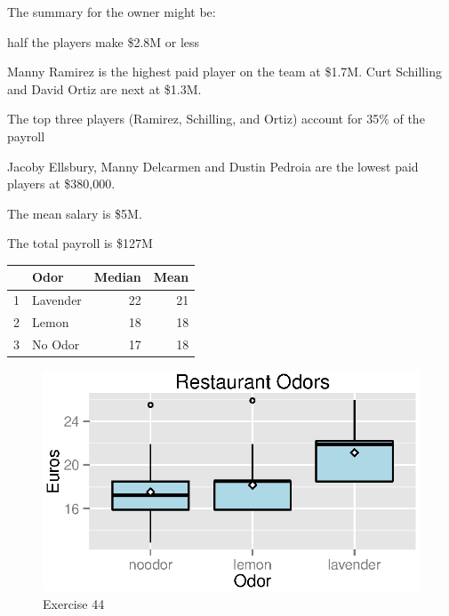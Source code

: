 \documentclass{exam}
\begin{document}
\begin{description}
        The summary for the owner might be:
        \begin{itemize*}
          \item half the players make \$2.8M or less
          \item Manny Ramirez is the highest paid player on the team at \$1.7M.
            Curt Schilling and David Ortiz are next at \$1.3M.
          \item The top three players (Ramirez, Schilling, and Ortiz) account
            for 35\% of the payroll
          \item Jacoby Ellsbury, Manny Delcarmen and Dustin Pedroia are the
            lowest paid players at \$380,000.
          \item The mean salary is \$5M.
          \item The total payroll is \$127M
        \end{itemize*}

      \item[44]
        \begin{table}[H]
          \centering
          \begin{tabular}{rlrr}
            \toprule
              & Odor     & Median & Mean \\
            \midrule
            1 & Lavender & 22     & 21 \\
            2 & Lemon    & 18     & 18 \\
            3 & No Odor  & 17     & 18 \\
            \bottomrule
          \end{tabular}
        \end{table}

        \begin{figure}[H]
          \centering
          \includegraphics{figures/ex44.eps}
          \caption{Exercise 44}
        \end{figure}


\end{description}
\end{document}
